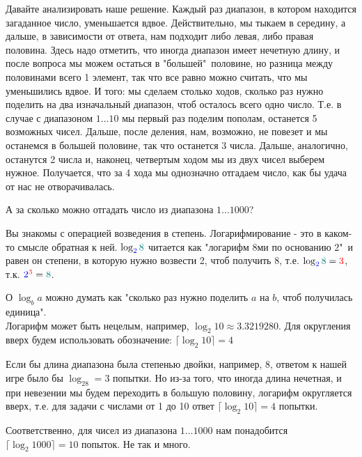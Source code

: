 \documentclass[12pt]{article} %
\begin{document}
Давайте анализировать наше решение. Каждый раз диапазон, в котором находится загаданное число, уменьшается вдвое. Действительно, мы тыкаем в середину, а дальше, в зависимости от ответа, нам подходит либо левая, либо правая половина. Здесь надо отметить, что иногда диапазон имеет нечетную длину, и после вопроса мы можем остаться в "большей"\ половине, но разница между половинами всего 1 элемент, так что все равно можно считать, что мы уменьшились вдвое. И того: мы сделаем столько ходов, сколько раз нужно поделить на два изначальный диапазон, чтоб осталось всего одно число. Т.е. в случае с диапазоном $1\ldots10$ мы первый раз поделим пополам, останется 5 возможных чисел. Дальше, после деления, нам, возможно, не повезет и мы останемся в большей половине, так что останется 3 числа. Дальше, аналогично, останутся 2 числа и, наконец, четвертым ходом мы из двух чисел выберем нужное. Получается, что за 4 хода мы однозначно отгадаем число, как бы удача от нас не отворачивалась.

А за сколько можно отгадать число из диапазона $1\ldots1000$?\\
\begin{tcolorbox}[colback=blue!5!white,colframe=blue!75!black,title={Математическая справка. Логарифм.}]
	Вы знакомы с операцией возведения в степень. Логарифмирование - это в каком-то смысле обратная к ней. $\log_{\textcolor{blue}{2}}\textcolor{teal}{8}$ читается как "логарифм 8ми по основанию 2"\ и равен он степени, в которую нужно возвести 2, чтоб получить 8, т.е. $\log_{\textcolor{blue}{2}}\textcolor{teal}{8} = \textcolor{red}{3}$, т.к. $\textcolor{blue}{2}^{\textcolor{red}{3}} = \textcolor{teal}{8}$.
	
	О $\log_b a$ можно думать как "сколько раз нужно поделить $a$ на $b$, чтоб получилась единица".\\
	Логарифм может быть нецелым, например, $\log_2{10} \approx 3.3219280$. Для округления вверх будем использовать обозначение: $\lceil \log_2{10} \rceil = 4$
\end{tcolorbox}
Если бы длина диапазона была степенью двойки, например, 8, ответом к нашей игре было бы $\log_28 = 3$ попытки. Но из-за того, что иногда длина нечетная, и при невезении мы будем переходить в большую половину, логарифм округляется вверх, т.е. для задачи с числами от 1 до 10 ответ $\lceil \log_2{10} \rceil = 4$ попытки.

Соответственно, для чисел из диапазона $1\ldots1000$ нам понадобится $\lceil \log_2{1000} \rceil = 10$ попыток. Не так и много.
\end{document}
